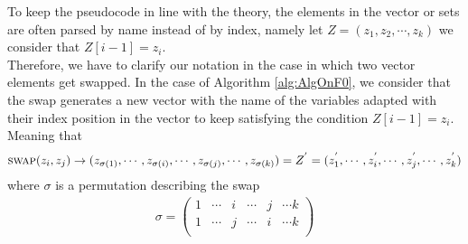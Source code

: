 \documentclass[11pt]{llncs}
\begin{document}
\begin{remark}\label{rem:permutationClarification}
    To keep the pseudocode in line with the theory, the elements in the vector or sets are often parsed by name instead of by index, namely let $Z = (z_1, z_2, \cdots, z_k)$ we consider that $Z[i-1] = z_i$.\\
    Therefore, we have to clarify our notation in the case in which two vector elements get swapped. In the case of Algorithm \ref{alg:AlgOnF0}, we consider that the swap generates a new vector with the name of the variables adapted with their index position in the vector to keep satisfying the condition $Z[i-1] = z_{i}$. Meaning that 
    \begin{align*}
        \mbox{\textsc{swap}}(z_i, z_j) \rightarrow (z_{\sigma(1)}, \cdots, z_{\sigma(i)}, \cdots, z_{\sigma(j)}, \cdots, z_{\sigma(k)}) = Z^{'} = (z^{'}_1, \cdots, z^{'}_i, \cdots, z^{'}_j, \cdots, z^{'}_k)
    \end{align*}
    where $\sigma$ is a permutation describing the swap
    \begin{align*}
        \sigma = \begin{pmatrix}
            1 & \cdots & i & \cdots & j & \cdots k\\
            1 & \cdots & j & \cdots & i & \cdots k\\
        \end{pmatrix}
    \end{align*}
\end{remark}

\end{document}
